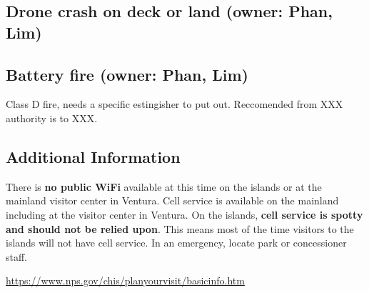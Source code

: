 \subsection{Drone crash on deck or land (owner: Phan, Lim)}


\subsection{Battery fire (owner: Phan, Lim)}
Class D fire, needs a specific estingisher to put out. Reccomended from XXX authority is to XXX.


\subsection{Additional Information}
There is \textbf{no public WiFi} available at this time on the islands or at the mainland visitor center in Ventura. Cell service is available on the mainland including at the visitor center in Ventura. On the islands, \textbf{cell service is spotty and should not be relied upon}. This means most of the time visitors to the islands will not have cell service. In an emergency, locate park or concessioner staff.

\url{https://www.nps.gov/chis/planyourvisit/basicinfo.htm}
